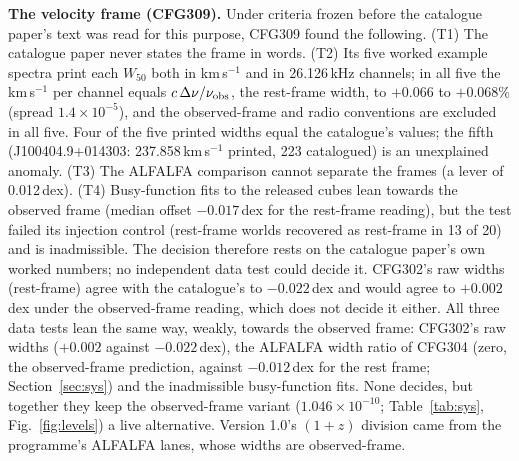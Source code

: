 \documentclass[10pt]{article}
\begin{document}
\textbf{The velocity frame (CFG309).} Under criteria frozen before the catalogue paper's text was read for this purpose, CFG309 found the following. (T1) The catalogue paper never states the frame in words. (T2) Its five worked example spectra print each $W_{50}$ both in km\,s$^{-1}$ and in 26.126\,kHz channels; in all five the km\,s$^{-1}$ per channel equals $c\,\Delta\nu/\nu_{\rm obs}$, the rest-frame width, to $+0.066$ to $+0.068$\% (spread $1.4\times10^{-5}$), and the observed-frame and radio conventions are excluded in all five. Four of the five printed widths equal the catalogue's values; the fifth (J100404.9+014303: 237.858\,km\,s$^{-1}$ printed, 223 catalogued) is an unexplained anomaly. (T3) The ALFALFA comparison cannot separate the frames (a lever of 0.012\,dex). (T4) Busy-function fits to the released cubes lean towards the observed frame (median offset $-0.017$\,dex for the rest-frame reading), but the test failed its injection control (rest-frame worlds recovered as rest-frame in 13 of 20) and is inadmissible. The decision therefore rests on the catalogue paper's own worked numbers; no independent data test could decide it. CFG302's raw widths (rest-frame) agree with the catalogue's to $-0.022$\,dex and would agree to $+0.002$\,dex under the observed-frame reading, which does not decide it either. All three data tests lean the same way, weakly, towards the observed frame: CFG302's raw widths ($+0.002$ against $-0.022$\,dex), the ALFALFA width ratio of CFG304 (zero, the observed-frame prediction, against $-0.012$\,dex for the rest frame; Section~\ref{sec:sys}) and the inadmissible busy-function fits. None decides, but together they keep the observed-frame variant ($1.046\times10^{-10}$; Table~\ref{tab:sys}, Fig.~\ref{fig:levels}) a live alternative. Version 1.0's $(1+z)$ division came from the programme's ALFALFA lanes, whose widths are observed-frame.
\end{document}
